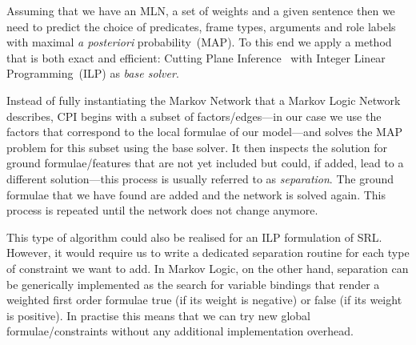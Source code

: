 



Assuming that we have an MLN, a set of weights and a given sentence then we need to predict the choice of predicates, frame types, arguments and role labels with maximal \emph{a posteriori} probability~(MAP). To this end we apply a method that is both exact and efficient: Cutting Plane Inference~\cite[CPI,][]{riedel08improving} with Integer Linear Programming~(ILP) as \emph{base solver}. 

Instead of fully instantiating the Markov Network that a Markov Logic Network describes, CPI begins with a subset of factors/edges---in our case we use the factors that correspond to the local formulae of our model---and solves the MAP problem for this subset using the base solver. It then inspects the solution for ground formulae/features that are not yet included but could, if added, lead to a different solution---this process is usually referred to as \emph{separation}. The ground formulae that we have found are added and the network is solved again. This process is repeated until the network does not change anymore.

This type of algorithm could also be realised for an ILP formulation of SRL. However, it would require us to write a dedicated separation routine for each type of constraint we want to add. In Markov Logic, on the other hand, separation can be generically implemented as the search for variable bindings that render a weighted first order formulae true (if its weight is negative) or false (if its weight is positive). In practise this means that we can try new global formulae/constraints without any additional implementation overhead.   

